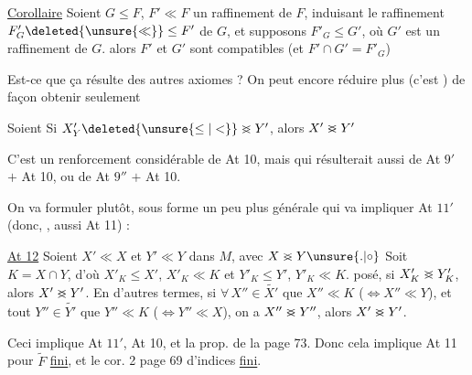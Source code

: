 \uline{Corollaire} Soient $G\leq F$, $F'\ll F$ un raffinement de $F$, induisant le raffinement $F'_G\deleted{\unsure{\ll}}\leq F'$ de $G$, et  supposons $F'_G\leq G'$, où $G'$ est un raffinement de $G$. alors  $F'$ et $G'$ sont compatibles (et $F'\cap G'=F'_G$) 

Est-ce que ça résulte des autres axiomes ?  On peut encore réduire plus (c'est ) de façon  obtenir seulement

  Soient
Si $X'_Y\deleted{\unsure{\leq|<}}\mathrel{>\mkern-14mu<}Y'$, alors $X'\mathrel{>\mkern-14mu<}Y'$

C'est  un renforcement considérable de At 10, mais qui résulterait aussi de At $9'$ $+$ At 10, ou de At $9''$ $+$ At 10.

On va formuler plutôt, sous forme un peu plus générale qui va impliquer At $11'$ (donc, , aussi At 11) :

\uline{At 12} Soient $X'\ll X$ et $Y'\ll Y$ dans $M$,  avec $X\mathrel{>\mkern-14mu<}Y\unsure{\mathord{.}|\circ}$ Soit $K=X\cap Y$, d'où $X'_K\leq X'$, $X'_K\ll K$ et $Y'_K\leq Y'$, $Y'_K\ll K$. 
posé, si $X'_K\mathrel{>\mkern-14mu<}Y'_K$, alors $X'\mathrel{>\mkern-14mu<}Y'$. En d'autres termes, si $\forall\, X''\in\widetilde{X'}$  que $X''\ll K$ ($\Leftrightarrow X''\ll Y$), et tout $Y''\in\widetilde{Y'}$  que $Y''\ll K$ ($\Longleftrightarrow Y''\ll X$), on a $X''\mathrel{>\mkern-14mu<}Y''$, alors $X'\mathrel{>\mkern-14mu<}Y'$.

Ceci implique At $11'$,  At 10, et la prop. de la page 73.
Donc cela implique At 11 pour  $\widetilde F$ \uline{fini}, et le cor. 2 page 69   d'indices \uline{fini}.


